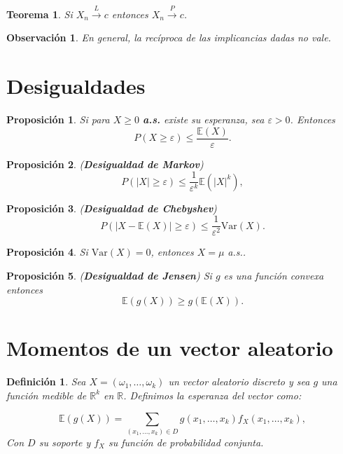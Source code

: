 \documentclass{report}
\newtheorem{thm}{Teorema}[section]
\newtheorem{prop}{Proposición}[section]
\newtheorem{dfn}{Definición}[section]
\newtheorem{obs}{Observación}[section]
\begin{document}
\begin{thm} \label{thm:conv_law_to_prob}
Si $X_n \xrightarrow{L} c$ entonces $X_n \xrightarrow{P} c$.
\end{thm}

\begin{obs}
    En general, la recíproca de las implicancias dadas no vale.
\end{obs}

\section{Desigualdades}
\begin{prop}
    Si para $X \geq 0$ \textbf{a.s.} existe su esperanza, sea $\varepsilon > 0$. Entonces
\[
P(X \geq \varepsilon) \leq \frac{\mathbb{E}(X)}{\varepsilon}. 
\]
\end{prop}

\begin{prop} \label{prop:markov} (\textbf{Desigualdad de Markov})
\[
P(|X| \geq \varepsilon) \leq \frac{1}{\varepsilon^k} \mathbb{E}(|X|^k), 
\]
\end{prop}

\begin{prop} \label{prop:chebyshev} (\textbf{Desigualdad de Chebyshev})
\[
P(|X - \mathbb{E}(X)| \geq \varepsilon) \leq \frac{1}{\varepsilon^2} \mathrm{Var}(X).
\]
\end{prop}

\begin{prop} \label{prop:variance_zero}
Si $\mathrm{Var}(X) = 0$, entonces $X = \mu$ a.s..
\end{prop}

\begin{prop} \label{prop:jensen} (\textbf{Desigualdad de Jensen}) Si $g$ es una función convexa entonces
\[
\mathbb{E}(g(X)) \geq g(\mathbb{E}(X)).
\]
\end{prop}

\section{Momentos de un vector aleatorio}
\begin{dfn} \label{dfn:expected_value_vector}
Sea $X = (\omega_1, \dots, \omega_k)$ un vector aleatorio discreto y sea $g$ una función medible de $\mathbb{R}^k$ en $\mathbb{R}$. 
Definimos la esperanza del vector como:


\[
\mathbb{E}(g(X)) = \sum_{(x_1,\dots,x_k) \in D} g(x_1,\dots,x_k)f_X(x_1,\dots,x_k),
\]
Con $D$ su soporte y $f_X$ su función de probabilidad conjunta.
\end{dfn}
\end{document}
